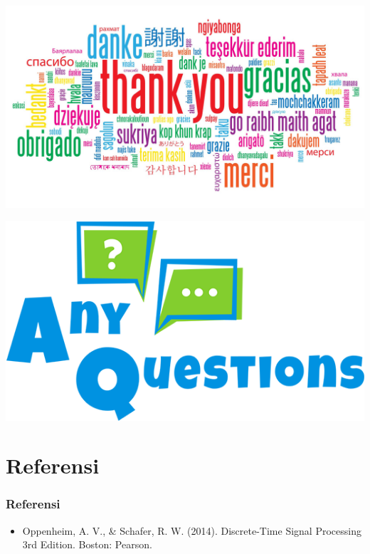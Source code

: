 \documentclass[pdflatex,compress]{beamer}
\begin{document}
\begin{frame}
	\begin{center}
		\includegraphics[width=\linewidth]{../../img/thank_you}
	\end{center}
	
\end{frame}

\begin{frame}
	\begin{center}
		\includegraphics[width=\linewidth]{../../img/any_questions.png}
	\end{center}
\end{frame}

\section{Referensi}

\begin{frame}
	\frametitle{Referensi}
	\begin{itemize}
		\item Oppenheim, A. V., \& Schafer, R. W. (2014). Discrete-Time Signal Processing 3rd Edition. Boston: Pearson.
	\end{itemize}
\end{frame}
\end{document}
